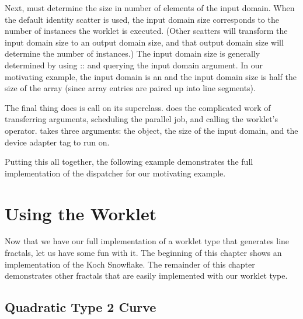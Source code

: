 
Next,  must determine the size in number of elements of the input domain.
When the default identity scatter is used, the input domain size corresponds to the number of instances the worklet is executed.
(Other scatters will transform the input domain size to an output domain size, and that output domain size will determine the number of instances.)
The input domain size is generally determined by using :: and querying the input domain argument.
In our motivating example, the input domain is an  and the input domain size is half the size of the array (since array entries are paired up into line segments).

The final thing  does is call  on its  superclass.
 does the complicated work of transferring arguments, scheduling the parallel job, and calling the worklet's operator.
 takes three arguments: the  object, the size of the input domain, and the device adapter tag to run on.


Putting this all together, the following example demonstrates the full implementation of the dispatcher for our motivating example.




\section{Using the Worklet}
\label{sec:NewWorkletTypes:Using}

Now that we have our full implementation of a worklet type that generates line fractals, let us have some fun with it.
The beginning of this chapter shows an implementation of the Koch Snowflake.
The remainder of this chapter demonstrates other fractals that are easily implemented with our worklet type.

\subsection{Quadratic Type 2 Curve}

